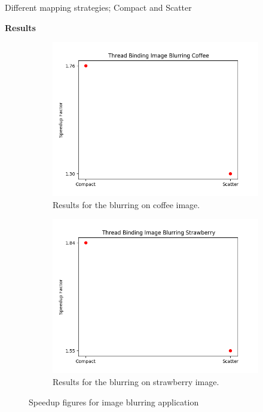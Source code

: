 \documentclass{article}
\begin{document}
\begin{description}
    \item[Different mapping strategies; Compact and Scatter]
\end{description}
\textbf{Results}
 \begin{figure}[!htb]
    \centering
    \begin{subfigure}{.45\textwidth}
        \centering
        \includegraphics[width=1\linewidth]{./img/binding_part_1_B_coffee.png}
        \caption{Results for the blurring on coffee image.}
    \end{subfigure} 
    \begin{subfigure}{.45\textwidth}
        \centering
        \includegraphics[width=1\linewidth]{./img/binding_part_1_B_strawberry.png}
        \caption{Results for the blurring on strawberry image.}
    \end{subfigure}
    \caption{Speedup figures for image blurring application}
\end{figure}
\end{document}
